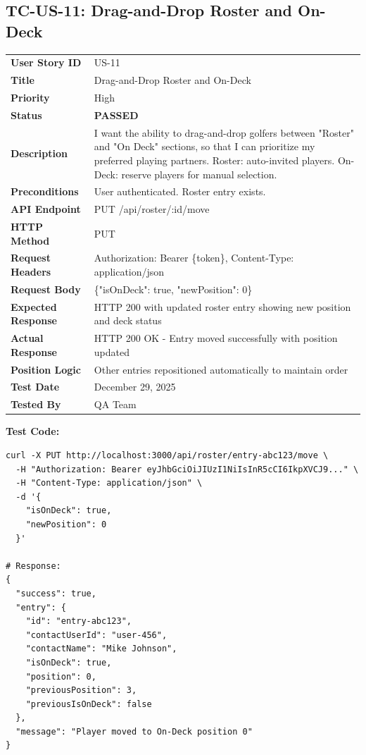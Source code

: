 \documentclass[11pt,a4paper]{article}
\newcommand{\passed}{\textcolor{pass}{\textbf{PASSED}}}
\begin{document}
\vspace{0.5cm}


\subsection{TC-US-11: Drag-and-Drop Roster and On-Deck}

\begin{tabularx}{\textwidth}{|p{3.2cm}|Y|}
\hline
{}
 \\
\hline
\textbf{User Story ID} & US-11 \\
\hline
\textbf{Title} & Drag-and-Drop Roster and On-Deck \\
\hline
\textbf{Priority} & High \\
\hline
\textbf{Status} & \passed \\
\hline
\textbf{Description} & I want the ability to drag-and-drop golfers between "Roster" and "On Deck" sections, so that I can prioritize my preferred playing partners. Roster: auto-invited players. On-Deck: reserve players for manual selection. \\
\hline
\textbf{Preconditions} & User authenticated. Roster entry exists. \\
\hline
\textbf{API Endpoint} & PUT /api/roster/:id/move \\
\hline
\textbf{HTTP Method} & PUT \\
\hline
\textbf{Request Headers} & Authorization: Bearer \{token\}, Content-Type: application/json \\
\hline
\textbf{Request Body} & \{"isOnDeck": true, "newPosition": 0\} \\
\hline
\textbf{Expected Response} & HTTP 200 with updated roster entry showing new position and deck status \\
\hline
\textbf{Actual Response} & HTTP 200 OK - Entry moved successfully with position updated \\
\hline
\textbf{Position Logic} & Other entries repositioned automatically to maintain order \\
\hline
\textbf{Test Date} & December 29, 2025 \\
\hline
\textbf{Tested By} & QA Team \\
\hline
\end{tabularx}

\vspace{0.3cm}
\textbf{Test Code:}
\begin{lstlisting}
curl -X PUT http://localhost:3000/api/roster/entry-abc123/move \
  -H "Authorization: Bearer eyJhbGciOiJIUzI1NiIsInR5cCI6IkpXVCJ9..." \
  -H "Content-Type: application/json" \
  -d '{
    "isOnDeck": true,
    "newPosition": 0
  }'

# Response:
{
  "success": true,
  "entry": {
    "id": "entry-abc123",
    "contactUserId": "user-456",
    "contactName": "Mike Johnson",
    "isOnDeck": true,
    "position": 0,
    "previousPosition": 3,
    "previousIsOnDeck": false
  },
  "message": "Player moved to On-Deck position 0"
}
\end{lstlisting}
\end{document}
